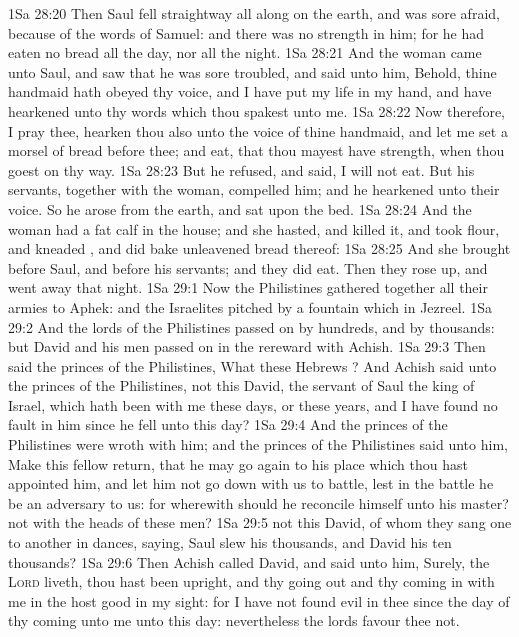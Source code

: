 \vs 1Sa 28:20 Then Saul fell straightway all along on the earth, and was sore afraid, because of the words of Samuel: and there was no strength in him; for he had eaten no bread all the day, nor all the night.
\vs 1Sa 28:21 And the woman came unto Saul, and saw that he was sore troubled, and said unto him, Behold, thine handmaid hath obeyed thy voice, and I have put my life in my hand, and have hearkened unto thy words which thou spakest unto me.
\vs 1Sa 28:22 Now therefore, I pray thee, hearken thou also unto the voice of thine handmaid, and let me set a morsel of bread before thee; and eat, that thou mayest have strength, when thou goest on thy way.
\vs 1Sa 28:23 But he refused, and said, I will not eat. But his servants, together with the woman, compelled him; and he hearkened unto their voice. So he arose from the earth, and sat upon the bed.
\vs 1Sa 28:24 And the woman had a fat calf in the house; and she hasted, and killed it, and took flour, and kneaded , and did bake unleavened bread thereof:
\vs 1Sa 28:25 And she brought  before Saul, and before his servants; and they did eat. Then they rose up, and went away that night.
\vs 1Sa 29:1 Now the Philistines gathered together all their armies to Aphek: and the Israelites pitched by a fountain which  in Jezreel.
\vs 1Sa 29:2 And the lords of the Philistines passed on by hundreds, and by thousands: but David and his men passed on in the rereward with Achish.
\vs 1Sa 29:3 Then said the princes of the Philistines, What  these Hebrews ? And Achish said unto the princes of the Philistines,  not this David, the servant of Saul the king of Israel, which hath been with me these days, or these years, and I have found no fault in him since he fell  unto this day?
\vs 1Sa 29:4 And the princes of the Philistines were wroth with him; and the princes of the Philistines said unto him, Make this fellow return, that he may go again to his place which thou hast appointed him, and let him not go down with us to battle, lest in the battle he be an adversary to us: for wherewith should he reconcile himself unto his master?  not  with the heads of these men?
\vs 1Sa 29:5  not this David, of whom they sang one to another in dances, saying, Saul slew his thousands, and David his ten thousands?
\vs 1Sa 29:6 Then Achish called David, and said unto him, Surely,  the \textsc{Lord} liveth, thou hast been upright, and thy going out and thy coming in with me in the host  good in my sight: for I have not found evil in thee since the day of thy coming unto me unto this day: nevertheless the lords favour thee not.
